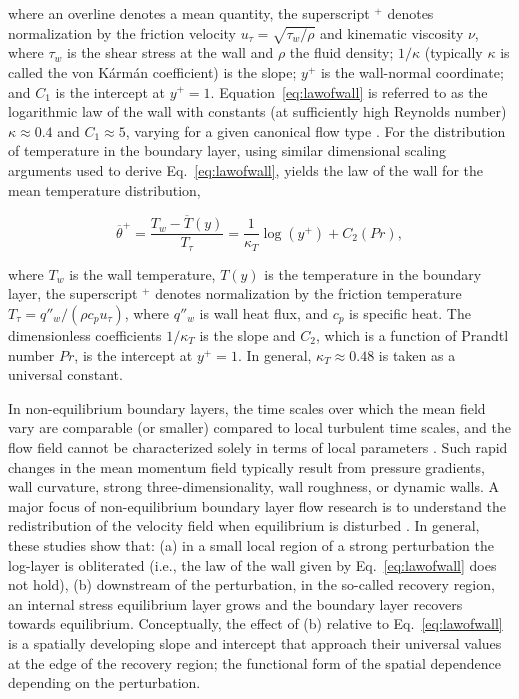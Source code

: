 \noindent  where an overline denotes a mean quantity, the superscript $^+$ denotes normalization by the friction velocity $u_\tau = \sqrt{\tau_w / \rho}$ and kinematic viscosity $\nu$, where $\tau_w$ is the shear stress at the wall and $\rho$ the fluid density; $1/\kappa$ (typically $\kappa$ is called the von K\'{a}rm\'{a}n coefficient) is the slope; $y^+$ is the wall-normal coordinate; and $C_1$ is the intercept at $y^+ = 1$. Equation~\ref{eq:lawofwall} is referred to as the logarithmic law of the wall with constants (at sufficiently high Reynolds number) $\kappa\approx0.4$ and $C_1\approx5$, varying for a given canonical flow type \cite{Nagib2008}. For the distribution of temperature in the boundary layer, using similar dimensional scaling arguments used to derive Eq.~\ref{eq:lawofwall}, yields the law of the wall for the mean temperature distribution,

\begin{equation}
{\overline \theta^+ } =  \overline{\frac{T_w - T(y)}{T_\tau}} = \frac{1}{\kappa_T}\log(y^+)+C_2(Pr), \label{eq:lawofwallT}
\end{equation}

\noindent where $T_w$ is the wall temperature, $T(y)$ is the temperature in the boundary layer, the superscript $^+$ denotes normalization by the friction temperature $T_\tau = q''_w / (\rho c_p u_\tau)$, where $q''_w$ is wall heat flux, and $c_p$ is specific heat. The dimensionless coefficients $1/\kappa_T$ is the slope and $C_2$, which is a function of Prandtl number $Pr$, is the intercept at $y^+=1$. In general, $\kappa_T \approx 0.48$ is taken as a universal constant.  

In non-equilibrium boundary layers, the time scales over which the mean field vary are comparable (or smaller) compared to local turbulent time scales, and the flow field cannot be characterized solely in terms of local parameters \cite{townsend1976}. Such rapid changes in the mean momentum field typically result from pressure gradients, wall curvature, strong three-dimensionality, wall roughness, or dynamic walls. A major focus of non-equilibrium boundary layer flow research is to understand the redistribution of the velocity field when equilibrium is disturbed \cite{Antonia1977, Bradshaw1972a, Bandyopadhyay1993, Castro1998}. In general, these studies show that: (a) in a small local region of a strong perturbation the log-layer is obliterated (i.e.,  the law of the wall given by Eq.~\ref{eq:lawofwall} does not hold), (b) downstream of the perturbation, in the so-called recovery region, an internal stress equilibrium layer grows and the boundary layer recovers towards equilibrium. Conceptually, the effect of (b) relative to Eq.~\ref{eq:lawofwall} is a spatially developing slope and intercept that approach their universal values at the edge of the recovery region; the functional form of the spatial dependence depending on the perturbation. 

